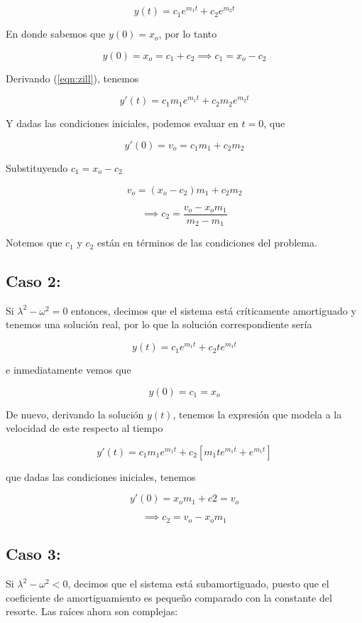 \documentclass[11pt]{amsart}
\begin{document}
\[ y(t) = c_1e^{m_1t}+c_2e^{m_2t}\]

En donde sabemos que $y(0) = x_o$, por lo tanto

\[ y(0) = x_o = c_1 + c_2 \implies c_1 = x_o - c_2\]

Derivando (\ref{eqn:zill}), tenemos

\[ y'(t) = c_1m_1e^{m_1t} + c_2m_2e^{m_2t} \]


Y dadas las condiciones iniciales, podemos evaluar en $t=0$, que

\[ y'(0) = v_o = c_1m_1 + c_2m_2\]

Substituyendo $c_1 = x_o - c_2$

\[ v_o = (x_o - c_2)m_1 + c_2m_2 \]

\[ \implies c_2 = \frac{v_o - x_om_1}{m_2-m_1}\]

Notemos que $c_1$ y $c_2$ est\'{a}n en t\'{e}rminos de las condiciones del problema. 

\vspace{1cm}

\subsection{Caso 2:}
Si $\lambda^2 - \omega^2=0$ entonces, decimos que el sistema est\'{a} cr\'{i}ticamente amortiguado y tenemos una soluci\'{o}n real, por lo que la soluci\'{o}n correspondiente ser\'{i}a 

\[ y(t) = c_1e^{m_1t} + c_2te^{m_1t}\]

e inmediatamente vemos que

\[ y(0)  = c_1 =  x_o\]

De nuevo, derivando la soluci\'{o}n $y(t)$, tenemos la expresi\'{o}n que modela a la velocidad de este respecto al tiempo

\[ y'(t) = c_1m_1e^{m_1t} + c_2[m_1te^{m_1t} + e^{m_1t}]\]

que dadas las condiciones iniciales, tenemos

\[ y'(0) = x_om_1 + c2 = v_o \]

\[ \implies c_2 = v_o - x_om_1\]


\vspace{1cm}
\subsection{Caso 3:}
Si $\lambda^2 - \omega^2 < 0$, decimos que el sistema est\'{a} subamortiguado, puesto que el coeficiente de amortiguamiento es peque\~{n}o comparado con la constante del resorte. Las ra\'{i}ces ahora son complejas:
\end{document}
